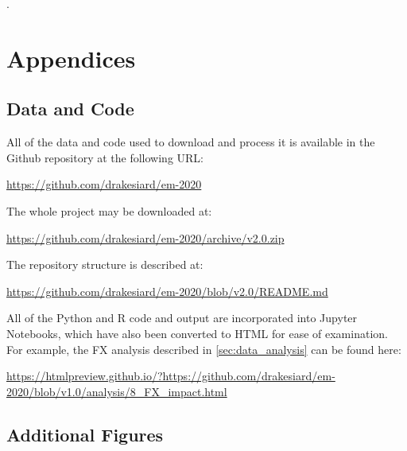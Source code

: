 \documentclass[12pt,a4paper]{article}
\begin{document}
\appendix

\renewcommand{\refname}{\section{References}\label{sec:references}}.


\clearpage

\section{Appendices}

\subsection{Data and Code}\label{sec:data_and_code}

All of the data and code used to download and process it is available in the Github repository at the following URL:

\url{https://github.com/drakesiard/em-2020}

\noindent
The whole project may be downloaded at:

\url{https://github.com/drakesiard/em-2020/archive/v2.0.zip}

\noindent
The repository structure is described at:

\url{https://github.com/drakesiard/em-2020/blob/v2.0/README.md}

\noindent
All of the Python and R code and output are incorporated into Jupyter Notebooks, which have also been converted to HTML for ease of examination. For example, the FX analysis described in \cref{sec:data_analysis} can be found here:

\begin{adjustbox}{max width=\textwidth}
\url{https://htmlpreview.github.io/?https://github.com/drakesiard/em-2020/blob/v1.0/analysis/8_FX_impact.html}
\end{adjustbox}

\clearpage
\subsection{Additional Figures}\label{sec:graph_appendix}

\listoffigures
\listoftables

\restoregeometry{}
\end{document}
